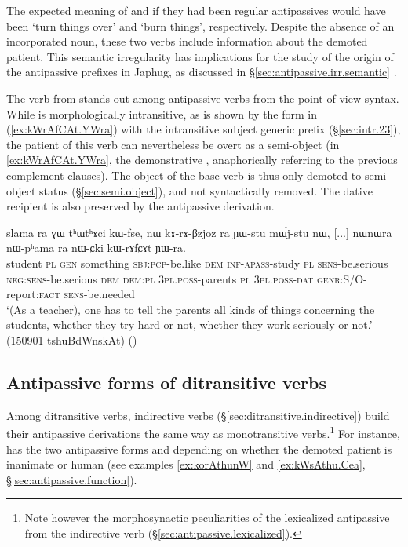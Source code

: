 The expected meaning of  and  if they had been regular antipassives would have been `turn things over' and `burn things', respectively. Despite the absence of an incorporated noun, these two verbs include information about the demoted patient. This semantic irregularity has implications for the study of the origin of the antipassive prefixes in Japhug, as discussed in §\ref{sec:antipassive.irr.semantic} .

 The verb  from  stands out among antipassive verbs from the point of view syntax. While  is morphologically intransitive, as is shown by the form  in (\ref{ex:kWrAfCAt.YWra}) with the intransitive subject generic prefix  (§\ref{sec:intr.23}), the patient of this verb can nevertheless be overt as a semi-object (in \ref{ex:kWrAfCAt.YWra}, the demonstrative , anaphorically referring to the previous complement clauses). The object of the base verb  is thus only demoted to semi-object status (§\ref{sec:semi.object}), and not syntactically removed. The dative recipient is also preserved by the antipassive derivation.

\begin{exe}
\ex \label{ex:kWrAfCAt.YWra}
\gll slama ra ɣɯ tʰɯtʰɤci kɯ-fse, nɯ kɤ-rɤ-βzjoz ra ɲɯ-stu mɯ́j-stu nɯ,
[...] nɯnɯra nɯ-pʰama ra nɯ-ɕki kɯ-rɤfɕɤt ɲɯ-ra. \\
student \textsc{pl} \textsc{gen} something \textsc{sbj}:\textsc{pcp}-be.like \textsc{dem} \textsc{inf}-\textsc{apass}-study \textsc{pl} \textsc{sens}-be.serious \textsc{neg}:\textsc{sens}-be.serious \textsc{dem} {  }  \textsc{dem}:\textsc{pl} \textsc{3pl}.\textsc{poss}-parents \textsc{pl} \textsc{3pl}.\textsc{poss}-\textsc{dat} \textsc{genr}:S/O-report:\textsc{fact} \textsc{sens}-be.needed \\
\glt `(As a teacher), one has to tell the parents all kinds of things concerning the students, whether they try hard or not, whether they work seriously or not.' (150901 tshuBdWnskAt)
()
\end{exe}

 
 \subsection{Antipassive forms of ditransitive verbs } \label{sec:antipassive.ditransitive}
 Among ditransitive verbs, indirective verbs (§\ref{sec:ditransitive.indirective}) build their antipassive derivations the same way as monotransitive verbs.\footnote{Note however the morphosynactic peculiarities of the lexicalized antipassive    from the indirective verb  (§\ref{sec:antipassive.lexicalized}). } For instance,   has the two antipassive forms  and  depending on whether the demoted patient is inanimate or human (see examples \ref{ex:korAthunW} and \ref{ex:kWsAthu.Cea}, §\ref{sec:antipassive.function}).


